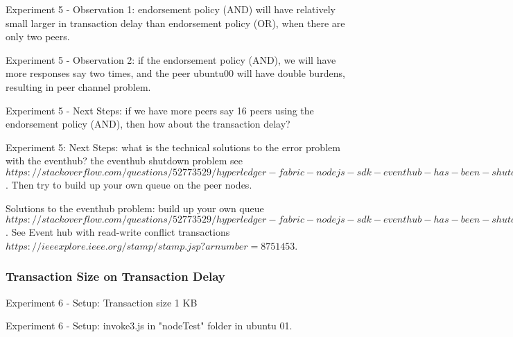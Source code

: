\documentclass[10pt,journal,compsoc, twoside]{IEEEtran}
\begin{document}
Experiment 5 - Observation 1: endorsement policy (AND) will have relatively small larger in transaction delay than endorsement policy (OR), when there are only two peers.

Experiment 5 - Observation 2: if the endorsement policy (AND), we will have more responses say two times, and the peer ubuntu00 will have double burdens, resulting in peer channel problem.

Experiment 5 - Next Steps: if we have more peers say 16 peers using the endorsement policy (AND), then how about the transaction delay?

Experiment 5: Next Steps: what is the technical solutions to the error problem with the eventhub? the eventhub shutdown problem see $https://stackoverflow.com/questions/52773529/hyperledger-fabric-nodejs-sdk-eventhub-has-been-shutdown$. Then try to build up your own queue on the peer nodes.

Solutions to the eventhub problem: build up your own queue $https://stackoverflow.com/questions/52773529/hyperledger-fabric-nodejs-sdk-eventhub-has-been-shutdown$. See Event hub with read-write conflict transactions $https://ieeexplore.ieee.org/stamp/stamp.jsp?arnumber=8751453$. 







\subsubsection{Transaction Size on Transaction Delay}

Experiment 6 - Setup: Transaction size 1 KB

Experiment 6 - Setup: invoke3.js in "nodeTest" folder in ubuntu 01.
\end{document}
